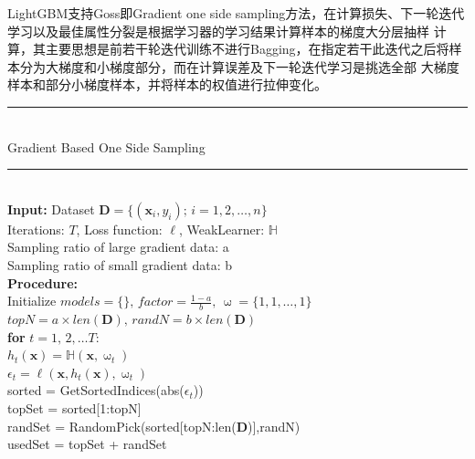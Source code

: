 \documentclass[a4paper]{article}
\begin{document}
\begin{itemize}
				LightGBM支持Goss即Gradient one side sampling方法，在计算损失、下一轮迭代学习以及最佳属性分裂是根据学习器的学习结果计算样本的梯度大分层抽样
				计算，其主要思想是前若干轮迭代训练不进行Bagging，在指定若干此迭代之后将样本分为大梯度和小梯度部分，而在计算误差及下一轮迭代学习是挑选全部
				大梯度样本和部分小梯度样本，并将样本的权值进行拉伸变化。\\
				\noindent\rule[0.10\baselineskip]{\textwidth}{0.75pt}\\
				Gradient Based One Side Sampling\\
				\noindent\rule[0.10\baselineskip]{\textwidth}{0.5pt}\\
						\textbf{Input:} Dataset $\textbf{D}=\{(\textbf{x}_i,y_i);\, i = 1,2,\dots, n\}$\\
						\hspace*{32pt} 	Iterations: $T$, Loss function: $\ell$, WeakLearner: $\mathbb{H}$\\
						\hspace*{32pt} 	Sampling ratio of large gradient data: a\\
						\hspace*{32pt} 	Sampling ratio of small gradient data: b\\
						\textbf{Procedure:}\\
						\hspace*{32pt} 	Initialize $models = \{\},\,factor = \frac{1-a}{b},\, \upomega = \{1,1,\dots,1\}$\\
						\hspace*{32pt} 	$topN = a\times len(\textbf{D}),\, randN = b\times len(\textbf{D})$\\
						\hspace*{48pt} 	\textbf{for} $t=1,\,2,\dots T$:\\
						\hspace*{64pt}	$h_t(\textbf{x}) = \mathbb{H}(\textbf{x},\upomega_t)$\\
						\hspace*{64pt}	$\epsilon_t = \ell(\textbf{x},h_t(\textbf{x}),\upomega_t)$\\
						\hspace*{64pt}	sorted = GetSortedIndices(abs($\epsilon_t$))\\
						\hspace*{64pt}	topSet = sorted[1:topN]\\
						\hspace*{64pt}	randSet = RandomPick(sorted[topN:len(\textbf{D})],randN)\\
						\hspace*{64pt}  usedSet = topSet + randSet\\

\end{itemize}
\end{document}
